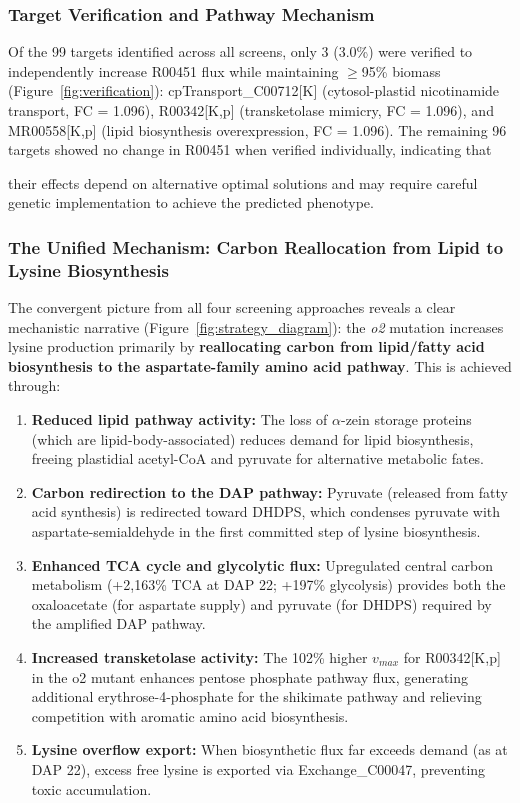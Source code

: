 \subsubsection{Target Verification and Pathway Mechanism}

Of the 99 targets identified across all screens, only 3 (3.0\%) were verified to independently increase R00451 flux while maintaining $\geq$95\% biomass (Figure~\ref{fig:verification}): cpTransport\_C00712[K] (cytosol-plastid nicotinamide transport, FC = 1.096), R00342[K,p] (transketolase mimicry, FC = 1.096), and MR00558[K,p] (lipid biosynthesis overexpression, FC = 1.096). The remaining 96 targets showed no change in R00451 when verified individually, indicating that 

their effects depend on alternative optimal solutions and may require careful genetic implementation to achieve the predicted phenotype.

\subsubsection{The Unified Mechanism: Carbon Reallocation from Lipid to Lysine Biosynthesis}

The convergent picture from all four screening approaches reveals a clear mechanistic narrative (Figure~\ref{fig:strategy_diagram}): the \textit{o2} mutation increases lysine production primarily by \textbf{reallocating carbon from lipid/fatty acid biosynthesis to the aspartate-family amino acid pathway}. This is achieved through:

\begin{enumerate}
    \item \textbf{Reduced lipid pathway activity:} The loss of $\alpha$-zein storage proteins (which are lipid-body-associated) reduces demand for lipid biosynthesis, freeing plastidial acetyl-CoA and pyruvate for alternative metabolic fates.
    
    \item \textbf{Carbon redirection to the DAP pathway:} Pyruvate (released from fatty acid synthesis) is redirected toward DHDPS, which condenses pyruvate with aspartate-semialdehyde in the first committed step of lysine biosynthesis.
    
    \item \textbf{Enhanced TCA cycle and glycolytic flux:} Upregulated central carbon metabolism (+2,163\% TCA at DAP 22; +197\% glycolysis) provides both the oxaloacetate (for aspartate supply) and pyruvate (for DHDPS) required by the amplified DAP pathway.
    
    \item \textbf{Increased transketolase activity:} The 102\% higher $v_{max}$ for R00342[K,p] in the o2 mutant enhances pentose phosphate pathway flux, generating additional erythrose-4-phosphate for the shikimate pathway and relieving competition with aromatic amino acid biosynthesis.
    
    \item \textbf{Lysine overflow export:} When biosynthetic flux far exceeds demand (as at DAP 22), excess free lysine is exported via Exchange\_C00047, preventing toxic accumulation.
\end{enumerate}

